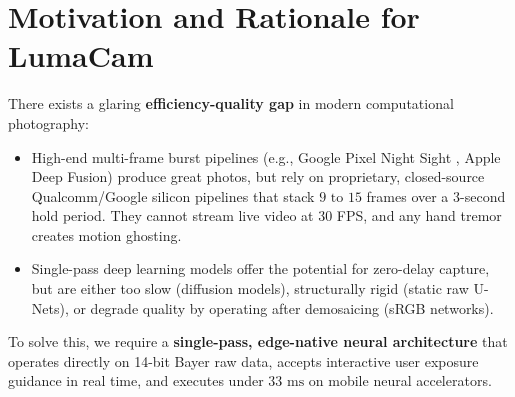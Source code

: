 \section{Motivation and Rationale for LumaCam}
There exists a glaring \textbf{efficiency-quality gap} in modern computational photography:
\begin{itemize}
    \item High-end multi-frame burst pipelines (e.g., Google Pixel Night Sight \cite{hasinoff2016burst}, Apple Deep Fusion) produce great photos, but rely on proprietary, closed-source Qualcomm/Google silicon pipelines that stack $9\text{ to }15$ frames over a 3-second hold period. They cannot stream live video at 30 FPS, and any hand tremor creates motion ghosting.
    \item Single-pass deep learning models offer the potential for zero-delay capture, but are either too slow (diffusion models), structurally rigid (static raw U-Nets), or degrade quality by operating after demosaicing (sRGB networks).
\end{itemize}

To solve this, we require a \textbf{single-pass, edge-native neural architecture} that operates directly on 14-bit Bayer raw data, accepts interactive user exposure guidance in real time, and executes under $33\text{ ms}$ on mobile neural accelerators.

